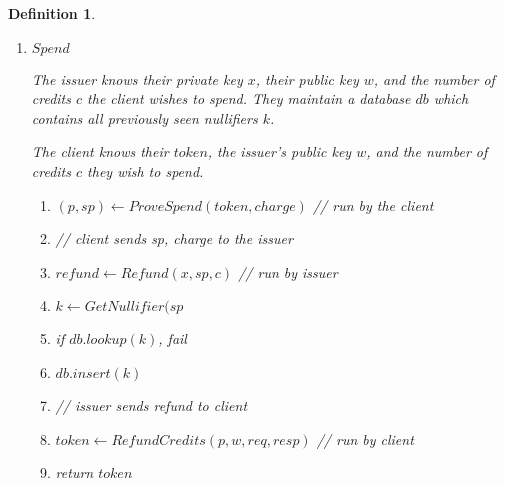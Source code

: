 \documentclass{article}
\newtheorem{definition}{Definition}
\begin{document}
\begin{definition}
\begin{enumerate}
    \item $Spend$

        The issuer knows their private key $x$, their public key $w$, and the number of
        credits $c$ the client wishes to spend. They maintain a database $db$ which
        contains all previously seen nullifiers $k$.

        The client knows their $token$, the issuer's public key $w$, and the
        number of credits $c$ they wish to spend.

        \begin{enumerate}
            \item[] $(p, sp) \leftarrow ProveSpend(token, charge)$ // run by the client
            \item[] // client sends sp, charge to the issuer
            \item[] $refund \leftarrow Refund(x, sp, c)$ // run by issuer
            \item[] $k \leftarrow GetNullifier(sp$
            \item[] if $db.lookup(k)$, fail
            \item[] $db.insert(k)$
            \item[] // issuer sends refund to client
            \item[] $token \leftarrow RefundCredits(p, w, req, resp)$ // run by client
            \item[] return $token$
        \end{enumerate}
\end{enumerate}

\end{definition}
\end{document}
